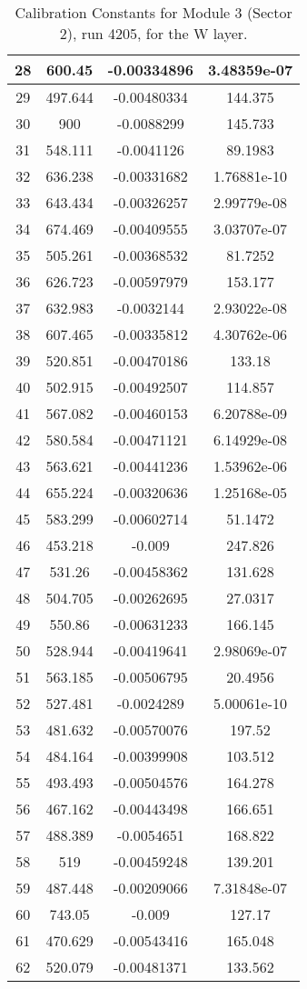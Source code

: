 \begin{table}[h]
{\begin{tabular}{|c|c|c|c|}
28	&	600.45	&	-0.00334896	&	3.48359e-07	\\	\hline
29	&	497.644	&	-0.00480334	&	144.375	\\	\hline
30	&	900	&	-0.0088299	&	145.733	\\	\hline
31	&	548.111	&	-0.0041126	&	89.1983	\\	\hline
32	&	636.238	&	-0.00331682	&	1.76881e-10	\\	\hline
33	&	643.434	&	-0.00326257	&	2.99779e-08	\\	\hline
34	&	674.469	&	-0.00409555	&	3.03707e-07	\\	\hline
35	&	505.261	&	-0.00368532	&	81.7252	\\	\hline
36	&	626.723	&	-0.00597979	&	153.177	\\	\hline
37	&	632.983	&	-0.0032144	&	2.93022e-08	\\	\hline
38	&	607.465	&	-0.00335812	&	4.30762e-06	\\	\hline
39	&	520.851	&	-0.00470186	&	133.18	\\	\hline
40	&	502.915	&	-0.00492507	&	114.857	\\	\hline
41	&	567.082	&	-0.00460153	&	6.20788e-09	\\	\hline
42	&	580.584	&	-0.00471121	&	6.14929e-08	\\	\hline
43	&	563.621	&	-0.00441236	&	1.53962e-06	\\	\hline
44	&	655.224	&	-0.00320636	&	1.25168e-05	\\	\hline
45	&	583.299	&	-0.00602714	&	51.1472	\\	\hline
46	&	453.218	&	-0.009	&	247.826	\\	\hline
47	&	531.26	&	-0.00458362	&	131.628	\\	\hline
48	&	504.705	&	-0.00262695	&	27.0317	\\	\hline
49	&	550.86	&	-0.00631233	&	166.145	\\	\hline
50	&	528.944	&	-0.00419641	&	2.98069e-07	\\	\hline
51	&	563.185	&	-0.00506795	&	20.4956	\\	\hline
52	&	527.481	&	-0.0024289	&	5.00061e-10	\\	\hline
53	&	481.632	&	-0.00570076	&	197.52	\\	\hline
54	&	484.164	&	-0.00399908	&	103.512	\\	\hline
55	&	493.493	&	-0.00504576	&	164.278	\\	\hline
56	&	467.162	&	-0.00443498	&	166.651	\\	\hline
57	&	488.389	&	-0.0054651	&	168.822	\\	\hline
58	&	519	&	-0.00459248	&	139.201	\\	\hline
59	&	487.448	&	-0.00209066	&	7.31848e-07	\\	\hline
60	&	743.05	&	-0.009	&	127.17	\\	\hline
61	&	470.629	&	-0.00543416	&	165.048	\\	\hline
62	&	520.079	&	-0.00481371	&	133.562	\\	\hline
              \end{tabular}
        }
        \caption{Calibration Constants for Module 3 (Sector 2), run 4205, for the W layer.}
\end{table}

